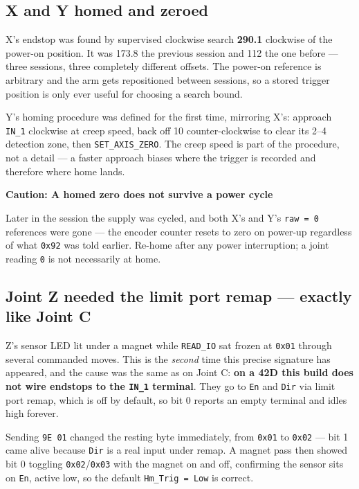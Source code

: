 \documentclass[11pt,letterpaper]{article}
\newenvironment{caution}[1]{%
    \par\addvspace{8pt}%
    \noindent{\color{cautionred}\rule{\linewidth}{0.8pt}}\par\vspace{2pt}
    \noindent\textbf{\color{cautionred}Caution: #1}\par\vspace{2pt}
}{%
    \par\vspace{2pt}\noindent{\color{cautionred}\rule{\linewidth}{0.4pt}}%
    \par\addvspace{8pt}%
}
\begin{document}
\subsection{X and Y homed and zeroed}
X's endstop was found by supervised clockwise search
\textbf{290.1\textdegree{}} clockwise of the power-on position. It was
173.8\textdegree{} the previous session and 112\textdegree{} the one before ---
three sessions, three completely different offsets. The power-on reference is
arbitrary and the arm gets repositioned between sessions, so a stored trigger
position is only ever useful for choosing a search bound.

Y's homing procedure was defined for the first time, mirroring X's: approach
\texttt{IN\_1} clockwise at creep speed, back off 10\textdegree{}
counter-clockwise to clear its 2--4\textdegree{} detection zone, then
\texttt{SET\_AXIS\_ZERO}. The creep speed is part of the procedure, not a detail
--- a faster approach biases where the trigger is recorded and therefore where
home lands.

\begin{caution}{A homed zero does not survive a power cycle}
Later in the session the supply was cycled, and both X's and Y's
\texttt{raw = 0} references were gone --- the encoder counter resets to zero on
power-up regardless of what \texttt{0x92} was told earlier. Re-home after any
power interruption; a joint reading \texttt{0} is not necessarily at home.
\end{caution}

\subsection{Joint Z needed the limit port remap --- exactly like Joint C}
Z's sensor LED lit under a magnet while \texttt{READ\_IO} sat frozen at
\texttt{0x01} through several commanded moves. This is the \emph{second} time
this precise signature has appeared, and the cause was the same as on Joint C:
\textbf{on a 42D this build does not wire endstops to the \texttt{IN\_1}
terminal}. They go to \texttt{En} and \texttt{Dir} via limit port remap, which is
off by default, so bit 0 reports an empty terminal and idles high forever.

Sending \texttt{9E 01} changed the resting byte immediately, from \texttt{0x01}
to \texttt{0x02} --- bit 1 came alive because \texttt{Dir} is a real input under
remap. A magnet pass then showed bit 0 toggling \texttt{0x02}/\texttt{0x03} with
the magnet on and off, confirming the sensor sits on \texttt{En}, active low, so
the default \texttt{Hm\_Trig = Low} is correct.
\end{document}
